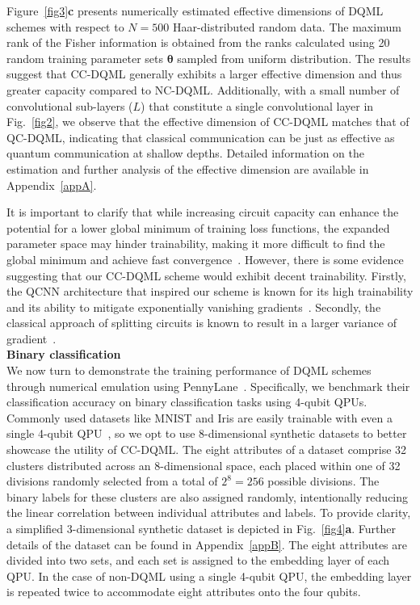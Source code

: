 \documentclass[aps,prx,reprint,amsmath,amssymb,superscriptaddress,nobibnotes,showpacs]{revtex4-2}
\begin{document}
Figure~\ref{fig3}\textbf{c} presents numerically estimated effective dimensions of DQML schemes with respect to $N=500$ Haar-distributed random data. The maximum rank of the Fisher information is obtained from the ranks calculated using 20 random training parameter sets $\boldsymbol{\theta}$ sampled from uniform distribution. The results suggest that CC-DQML generally exhibits a larger effective dimension and thus greater capacity compared to NC-DQML. Additionally, with a small number of convolutional sub-layers ($L$) that constitute a single convolutional layer in Fig.~\ref{fig2}, we observe that the effective dimension of CC-DQML matches that of QC-DQML, indicating that classical communication can be just as effective as quantum communication at shallow depths. Detailed information on the estimation and further analysis of the effective dimension are available in Appendix~\ref{appA}. 

It is important to clarify that while increasing circuit capacity can enhance the potential for a lower global minimum of training loss functions, the expanded parameter space may hinder trainability, making it more difficult to find the global minimum and achieve fast convergence~\cite{caro2022generalization,haug2021capacity,holmes2022connecting}. However, there is some evidence suggesting that our CC-DQML scheme would exhibit decent trainability. Firstly, the QCNN architecture that inspired our scheme is known for its high trainability and its ability to mitigate exponentially vanishing gradients~\cite{pesah2021absence}. Secondly, the classical approach of splitting circuits is known to result in a larger variance of gradient~\cite{tuysuz2023classical}.\\


\noindent\textbf{Binary classification}\\
We now turn to demonstrate the training performance of DQML schemes through numerical emulation using PennyLane~\cite{bergholm2018pennylane}.
Specifically, we benchmark their classification accuracy on binary classification tasks using 4-qubit QPUs.
Commonly used datasets like MNIST and Iris are easily trainable with even a single 4-qubit QPU~\cite{hur2022quantum, abbas2021power}, so we opt to use 8-dimensional synthetic datasets to better showcase the utility of CC-DQML. The eight attributes of a dataset comprise 32 clusters distributed across an 8-dimensional space, each placed within one of 32 divisions randomly selected from a total of $2^8 = 256$ possible divisions. The binary labels for these clusters are also assigned randomly, intentionally reducing the linear correlation between individual attributes and labels. To provide clarity, a simplified 3-dimensional synthetic dataset is depicted in Fig.~\ref{fig4}\textbf{a}. Further details of the dataset can be found in Appendix~\ref{appB}. The eight attributes are divided into two sets, and each set is assigned to the embedding layer of each QPU. In the case of non-DQML using a single 4-qubit QPU, the embedding layer is repeated twice to accommodate eight attributes onto the four qubits.
\end{document}
